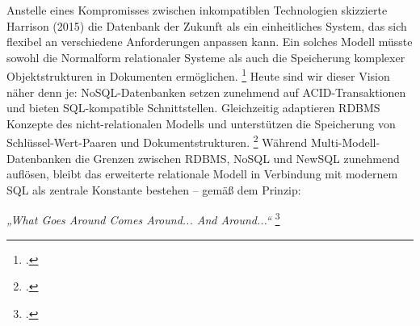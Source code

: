Anstelle eines Kompromisses zwischen inkompatiblen Technologien skizzierte Harrison (2015) die Datenbank der Zukunft als ein einheitliches System, das sich flexibel an verschiedene Anforderungen anpassen kann. Ein solches Modell müsste sowohl die Normalform relationaler Systeme als auch die Speicherung komplexer Objektstrukturen in Dokumenten ermöglichen. \footcite[S. 195–202, S. 214]{harrisonNextGenerationDatabases2015} Heute sind wir dieser Vision näher denn je: NoSQL-Datenbanken setzen zunehmend auf ACID-Transaktionen und bieten SQL-kompatible Schnittstellen. Gleichzeitig adaptieren RDBMS Konzepte des nicht-relationalen Modells und unterstützen die Speicherung von Schlüssel-Wert-Paaren und Dokumentstrukturen. \footcite[S. 22 ff.]{stonebrakerWhatGoesComes2024} Während Multi-Modell-Datenbanken die Grenzen zwischen RDBMS, NoSQL und NewSQL zunehmend auflösen, bleibt das erweiterte relationale Modell in Verbindung mit modernem SQL als zentrale Konstante bestehen – gemäß dem Prinzip: 

\begin{center}
    \textit{„What Goes Around Comes Around... And Around...“} \vspace{0.1cm}\footcite{stonebrakerWhatGoesComes2024}
\end{center}






